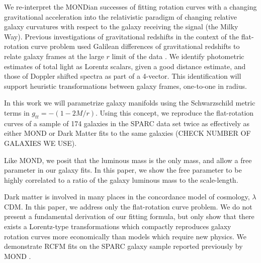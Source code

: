 \documentclass[reprint,%
 amsmath,amssymb,
 aps,
]{revtex4-1}
\begin{document}
  We re-interpret the MONDian   successes of fitting rotation curves with  a changing gravitational acceleration  into the relativistic paradigm of changing relative galaxy curvatures with respect to the galaxy receiving the signal (the Milky Way). Previous investigations of gravitational redshifts in the context of the flat-rotation curve problem   used  Galilean differences of gravitational redshifts to relate galaxy frames at the large $r$ limit of the data \cite{MTW}.  We identify
    photometric estimates of total light as Lorentz scalars, given a good distance estimate, and those of Doppler shifted spectra as  part of a 4-vector. This identification will support heuristic transformations between galaxy frames, one-to-one in radius.
  
  
In this work we will parametrize galaxy manifolds using the Schwarzschild metric terms in $g_{tt} = -(1-2M/r)$. 
Using this concept, we  reproduce the flat-rotation curves of a sample of 174 galaxies in the SPARC data set twice as effectively as either MOND or Dark Matter fits to the same galaxies (CHECK NUMBER OF GALAXIES WE USE).
  
  Like MOND, we posit that the luminous mass is the only mass, and allow a  free parameter in our galaxy fits. In this paper, we show the free parameter to be  highly correlated to a ratio of the galaxy luminous mass to the scale-length.
 
  
 
 
 
  
 Dark matter is   involved in many places in the concordance model of cosmology,     $\lambda$CDM. In  this paper, we   address only the flat-rotation curve problem.      We do not present a fundamental derivation of our fitting formula, but only  show  that there exists a   Lorentz-type transformations  which compactly  reproduces galaxy rotation curves  more economically than models which require     new physics.    We demonstrate RCFM  fits on the SPARC\cite{2016Lelli} galaxy sample   reported previously by     MOND \cite{McGaugh2016RAR}. 
   
 
 
  
  
  
  
\end{document}

